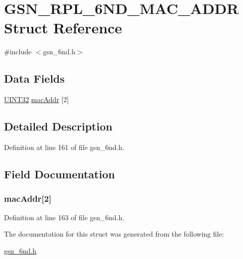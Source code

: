 \hypertarget{a00196}{
\section{GSN\_\-RPL\_\-6ND\_\-MAC\_\-ADDR Struct Reference}
\label{a00196}
}


{\ttfamily \#include $<$gsn\_\-6nd.h$>$}

\subsection*{Data Fields}
\begin{DoxyCompactItemize}
\item 
\hyperlink{a00660_gae1e6edbbc26d6fbc71a90190d0266018}{UINT32} \hyperlink{a00196_aeeaea6bb1ea47caa7e0601c6158f15de}{macAddr} \mbox{[}2\mbox{]}
\end{DoxyCompactItemize}


\subsection{Detailed Description}


Definition at line 161 of file gsn\_\-6nd.h.



\subsection{Field Documentation}
\hypertarget{a00196_aeeaea6bb1ea47caa7e0601c6158f15de}{
\subsubsection[{macAddr}]{ {\bf macAddr}\mbox{[}2\mbox{]}}}
\label{a00196_aeeaea6bb1ea47caa7e0601c6158f15de}


Definition at line 163 of file gsn\_\-6nd.h.



The documentation for this struct was generated from the following file:\begin{DoxyCompactItemize}
\item 
\hyperlink{a00473}{gsn\_\-6nd.h}\end{DoxyCompactItemize}
